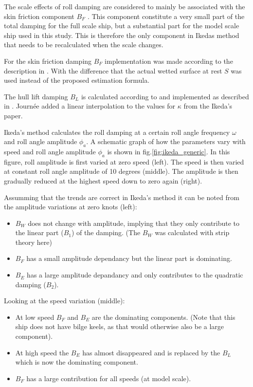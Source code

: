 The scale effects of roll damping are considered to mainly be associated
with the skin friction component $B_F$ \citep{7505983/FB64RGPF}. This
component constitute a very small part of the total damping for the full
scale ship, but a substantial part for the model scale ship used in this
study. This is therefore the only component in Ikedas method that needs
to be recalculated when the scale changes.

For the skin friction damping $B_F$ implementation was made according
to the description in \citep{7505983/UGK6YEVD}. With the difference that
the actual wetted surface at rest $S$ was used instead of the proposed
estimation formula.

The hull lift damping $B_L$ is calculated according to
\citep{7505983/937PN5DT} and implemented as described in
\citep{7505983/UYUAYY7E}. Journ\'ee added a linear interpolation to the
values for $\kappa$ from the Ikeda's paper.

Ikeda's method calculates the roll damping at a certain roll angle
frequency $\omega$ and roll angle amplitude $\phi_a$. A schematic
graph of how the parameters vary with speed and roll angle amplitude
$\phi_a$ is shown in fig.\ref{fig:ikeda_generic}. In this
figure, roll amplitude is first varied at zero speed (left). The speed
is then varied at constant roll angle amplitude of 10 degrees (middle).
The amplitude is then gradually reduced at the highest speed down to
zero again (right).

Assumming that the trends are correct in Ikeda's method it can be noted
from the amplitude variations at zero knots (left):

\begin{itemize}
\item $B_W$ does not change with amplitude, implying that they only contribute to the linear part ($B_1$) of the damping. (The $B_W$ was calculated with strip theory here)
\item $B_F$ has a small amplitude dependancy but the linear part is dominating.
\item $B_E$ has a large amplitude depandancy and only contributes to the quadratic damping ($B_2$)\citep{7505983/4AFVVGNT}.
\end{itemize}

Looking at the speed variation (middle):

\begin{itemize}
\item At low speed $B_F$ and $B_E$ are the dominating components. (Note that this ship does not have bilge keels, as that would otherwise also be a large component).
\item At high speed the $B_E$ has almost disappeared and is replaced by the $B_L$ which is now the dominating component.
\item $B_F$ has a large contribution for all speeds (at model scale).
\end{itemize}

